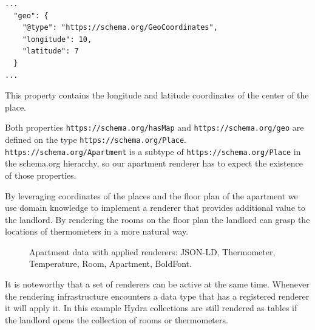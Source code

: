 \lstset{language=JSON}
\begin{lstlisting}[caption=The \lstinline{https://schema.org/geo} property of apartment /apartments/0.]
...
  "geo": {
    "@type": "https://schema.org/GeoCoordinates",
    "longitude": 10,
    "latitude": 7
  }
...
\end{lstlisting}

This property contains the longitude and latitude coordinates of the center of the place.

Both properties \lstinline{https://schema.org/hasMap} and \lstinline{https://schema.org/geo} are defined on the type \lstinline{https://schema.org/Place}. \lstinline{https://schema.org/Apartment} is a subtype of \lstinline{https://schema.org/Place} in the schema.org hierarchy, so our apartment renderer has to expect the existence of those properties.

By leveraging coordinates of the places and the floor plan of the apartment we use domain knowledge to implement a renderer that provides additional value to the landlord. By rendering the rooms on the floor plan the landlord can grasp the locations of thermometers in a more natural way.

\begin{figure}[!htb]
  \caption{Apartment data with applied renderers: JSON-LD, Thermometer, Temperature, Room, Apartment, BoldFont.}
\end{figure}

It is noteworthy that a set of renderers can be active at the same time. Whenever the rendering infrastructure encounters a data type that has a registered renderer it will apply it. In this example Hydra collections are still rendered as tables if the landlord opens the collection of rooms or thermometers.

